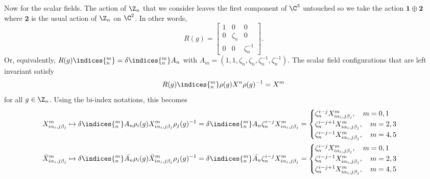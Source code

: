 \documentclass{worksheetclass}
\begin{document}
        Now for the scalar fields. The action of $\Z_n$ that we consider leaves the first component of $\C^3$ untouched so we take the action $\boldsymbol{1}\oplus\boldsymbol{2}$ where $\boldsymbol{2}$ is the usual action of $\Z_n$ on $\C^2$. In other words, 
        \begin{equation}
            R(g)=
            \begin{bmatrix}
                1 & 0 & 0 \\
                0 & \zeta_n & 0 \\
                0 & 0 & \zeta^{-1}_n
            \end{bmatrix}.
        \end{equation}
        Or, equivalently, $R(g)\indices{^m_n}=\delta\indices{^m_n}A_n$ with $A_m=(1,1,\zeta_n,\zeta_n,\zeta^{-1}_n,\zeta^{-1}_n)$. The scalar field configurations that are left invariant satisfy
        \begin{equation}
            R(g)\indices{^m_n}\rho(g)X^n\rho(g)^{-1}=X^m
        \end{equation}
        for all $g\in\Z_n$. Using the bi-index notations, this becomes
        \begin{align}
            X^m_{i\alpha_i,j\beta_j}\mapsto  \delta\indices{^m_n}A_n\rho_i(g)X^m_{i\alpha_i,j\beta_j}\rho_j(g)^{-1}  = \delta\indices{^m_n}A_n\zeta^{i-j}_n X^m_{i\alpha_i,j\beta_j} =
            \begin{cases}
                \zeta^{i-j}_nX^m_{i\alpha_i,j\beta_j},\quad m=0,1\\
                \zeta^{i-j+1}_nX^m_{i\alpha_i,j\beta_j},\quad m=2,3\\
                \zeta^{i-j-1}_nX^m_{i\alpha_i,j\beta_j},\quad m=4,5\\
            \end{cases}\\
            \bar{X}^m_{i\alpha_i,j\beta_j}\mapsto \delta\indices{^m_n}\bar{A_n}\rho_i(g)\bar{X}^m_{i\alpha_i,j\beta_j}\rho_j(g)^{-1}  = \delta\indices{^m_n}\bar{A_n}\zeta^{i-j}_n X^m_{i\alpha_i,j\beta_j} =
            \begin{cases}
                \zeta^{i-j}_nX^m_{i\alpha_i,j\beta_j},\quad m=0,1\\
                \zeta^{i-j-1}_nX^m_{i\alpha_i,j\beta_j},\quad m=2,3\\
                \zeta^{i-j+1}_nX^m_{i\alpha_i,j\beta_j},\quad m=4,5\\
            \end{cases}
        \end{align}
\end{document}
